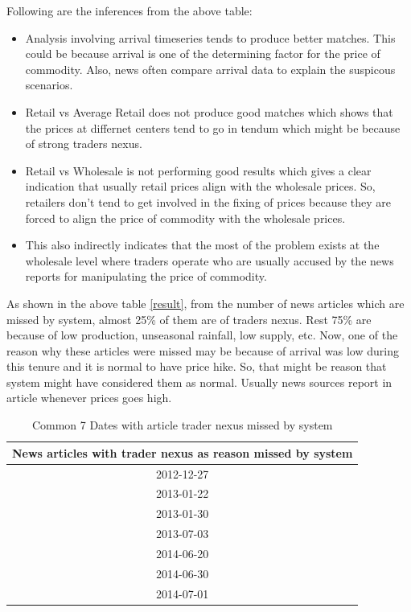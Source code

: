 \documentclass[a4paper,10pt]{article}
\begin{document}
Following are the inferences from the above table:
\begin{itemize}
 \item Analysis involving arrival timeseries tends to produce better matches. This could be because arrival is one of the determining factor for the price of commodity. Also, news often compare arrival data to explain the suspicous scenarios.
 \item Retail vs Average Retail does not produce good matches which shows that the prices at differnet centers tend to go in tendum which might be because of strong traders nexus.
 \item Retail vs Wholesale is not performing good results which gives a clear indication that usually retail prices align with the wholesale prices. So, retailers don't tend to get involved in the fixing of prices because they are forced to align the price of commodity with the wholesale prices.
 \item This also indirectly indicates that the most of the problem exists at the wholesale level where traders operate who are usually accused by the news reports for manipulating the price of commodity.
\end{itemize}

As shown in the above table \ref{result}, from the number of news articles which are missed by system, almost 25\% of them are of traders nexus. Rest 75\% are because of low production, unseasonal rainfall, low supply, etc. Now, one of the reason why these articles were missed may be because of arrival was low during this tenure and it is normal to have price hike. So, that might be reason that system might have considered them as normal. Usually news sources report in article whenever prices goes high.

\begin{table}[H]
	\centering	
	\begin{tabular}{|c|}
		\hline
		\textbf{News articles with trader nexus as reason missed by system} \\ \hline
		2012-12-27                                                \\ \hline
		2013-01-22                                                \\ \hline
		2013-01-30                                                \\ \hline
		2013-07-03                                                \\ \hline
		2014-06-20                                                \\ \hline
		2014-06-30                                                \\ \hline
		2014-07-01                                                \\ \hline
	\end{tabular}
	\caption{Common 7 Dates with article trader nexus missed by system}
	\label{table:missed7}
\end{table}
\end{document}
